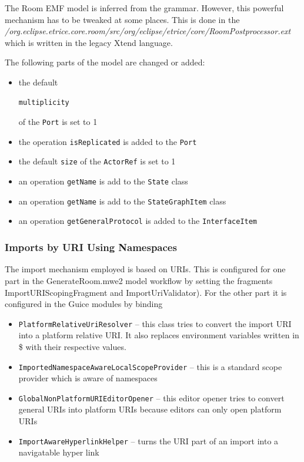 The Room EMF model is inferred from the grammar. However, this powerful mechanism has to be tweaked at 
some places.
This is done in the 
\textit{/org.eclipse.etrice.core.room/src/org/eclipse/etrice/core/RoomPostprocessor.ext} which is written 
in the legacy Xtend language.

The following parts of the model are changed or added:
\begin{itemize}
\item the default \begin{verbatim}multiplicity\end{verbatim} of the \texttt{Port} is set to 1
\item the operation \texttt{isReplicated} is added to the \texttt{Port}
\item the default \texttt{size} of the \texttt{ActorRef} is set to 1
\item an operation \texttt{getName} is add to the \texttt{State} class
\item an operation \texttt{getName} is add to the \texttt{StateGraphItem} class
\item an operation \texttt{getGeneralProtocol} is added to the \texttt{InterfaceItem}
\end{itemize}

\subsubsection{Imports by URI Using Namespaces}

The import mechanism employed is based on URIs. This is configured for one part in the GenerateRoom.mwe2 
model workflow by setting the fragments ImportURIScopingFragment and ImportUriValidator). For the other 
part it is configured in the Guice modules by binding
\begin{itemize}
\item \texttt{PlatformRelativeUriResolver} -- this class tries to convert the import URI into a platform 
relative URI. It also replaces environment variables written in \${} with their respective values.
\item \texttt{ImportedNamespaceAwareLocalScopeProvider} -- this is a standard scope provider which is 
aware of namespaces
\item \texttt{GlobalNonPlatformURIEditorOpener} -- this editor opener tries to convert general URIs into 
platform URIs because editors can only open platform URIs
\item \texttt{ImportAwareHyperlinkHelper} -- turns the URI part of an import into a navigatable hyper link
\end{itemize}

